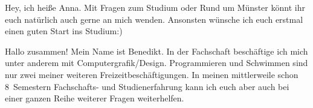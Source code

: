 \begin{multicols*}{2}
{Hey, ich heiße Anna. Mit Fragen zum Studium oder Rund um Münster könnt ihr euch
	natürlich auch gerne an mich wenden. Ansonsten wünsche ich euch erstmal einen guten
	Start ins Studium:)
}
\vspace{0.5cm}

{Hallo zusammen! Mein Name ist Benedikt. In der Fachschaft beschäftige ich mich unter anderem mit Computergrafik/Design. Programmieren und Schwimmen sind nur zwei meiner weiteren Freizeitbeschäftigungen. In meinen mittlerweile schon 8~Semestern Fachschafts- und Studienerfahrung kann ich euch aber auch bei einer ganzen Reihe weiterer Fragen weiterhelfen. 
}
\vspace{0.5cm}



\end{multicols*}
